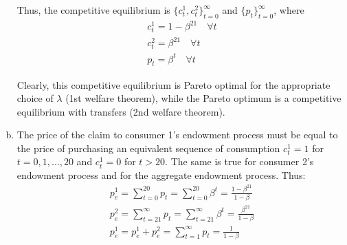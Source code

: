 \documentclass{article}
\begin{document}
\begin{enumerate}[(a)]
      Thus, the competitive equilibrium is
      $\{c_t^1,c_t^2\}_{t=0}^\infty$ and $\{p_t\}_{t=0}^\infty$, where
      \begin{align*}
        c_t^1=1-\beta^{21}\quad\forall t\\
        c_t^2=\beta^{21}\quad\forall t\\
        p_t=\beta^t\quad\forall t
      \end{align*}

      Clearly, this competitive equilibrium is Pareto optimal for the
      appropriate choice of $\lambda$ (1st welfare theorem), while the
      Pareto optimum is a competitive equilibrium with transfers (2nd
      welfare theorem).

    \item The price of the claim to consumer 1's endowment process
      must be equal to the price of purchasing an equivalent sequence
      of consumption $c_t^1=1$ for $t=0,1,...,20$ and $c_t^1=0$ for
      $t>20$. The same is true for consumer 2's endowment process and
      for the aggregate endowment process. Thus:
      \begin{gather*}
        p_e^1=\sum_{t=0}^{20}p_t=\sum_{t=0}^{20}\beta^t=\frac{1-\beta^{21}}{1-\beta}\\
        p_e^2=\sum_{t=21}^\infty p_t=\sum_{t=21}^\infty \beta^t=\frac{\beta^{21}}{1-\beta}\\
        p_e^1=p_e^1+p_e^2=\sum_{t=1}^\infty p_t=\frac{1}{1-\beta}\\
      \end{gather*}


\end{enumerate}



\section{}
\end{document}
